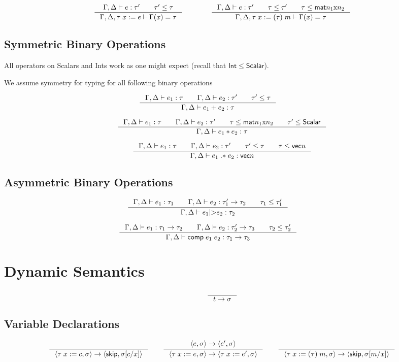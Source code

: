 \documentclass{article}
\begin{document}
\[  %
\inference[]{\Gamma,\Delta|-e:\tau'\qquad\tau'\leq\tau}{\Gamma,\Delta,\tau\;x:=e|-\Gamma(x)=\tau}
\qquad\qquad
\inference[]{\Gamma,\Delta|-e:\tau'\qquad\tau\leq\tau'\qquad\tau\leq\mat}
{\Gamma,\Delta,\tau\;x:=(\tau)\;m|-\Gamma(x)=\tau}
\]

\subsection{Symmetric Binary Operations}

All operators on Scalars and Ints work as one might expect (recall that $\mathsf{Int}\leq\mathsf{Scalar}$).

We assume symmetry for typing for all following binary operations

\[  %
\inference[]{\Gamma,\Delta|-e_1:\tau\qquad\Gamma,\Delta|-e_2:\tau'\qquad\tau'\leq\tau}
{\Gamma,\Delta|-e_1+e_2:\tau}
\qquad\qquad
\]

\[
\inference[]{\Gamma,\Delta|-e_1:\tau\qquad\Gamma,\Delta|-e_2:\tau'\qquad\tau\leq\mat\qquad\tau'\leq\mathsf{Scalar}}
{\Gamma,\Delta|-e_1*e_2:\tau}
\]

\[ %
\inference[]{\Gamma,\Delta|-e_1:\tau\qquad\Gamma,\Delta|-e_2:\tau'\qquad\tau'\leq\tau\qquad\tau\leq\mathsf{vec}n}
{\Gamma,\Delta|-e_1\;\mathsf{.*}\;e_2:\mathsf{vec}n}
\]

\subsection{Asymmetric Binary Operations}

\[  %
\inference[]{\Gamma,\Delta|-e_1:\tau_1\qquad\Gamma,\Delta|-e_2:\tau_1'->\tau_2\qquad\tau_1\leq\tau_1'}
{\Gamma,\Delta|-e_1\textnormal{|>}e_2:\tau_2}
\qquad\qquad
\]

\[  %
\inference[]{\Gamma,\Delta|-e_1:\tau_1->\tau_2\qquad\Gamma,\Delta|-e_2:\tau_2'->\tau_3\qquad\tau_2\leq\tau_2'}
{\Gamma,\Delta|-\mathsf{comp}\;e_1\;e_2:\tau_1->\tau_3}
\qquad\qquad
\]

\section{Dynamic Semantics}

\[
\inference[]{}{t->\sigma}
\]

\subsection{Variable Declarations}
\[
\inference[]{}{\env{\tau\;x:=c}->\langle\mathsf{skip},\sigma[c/x]\rangle}
\qquad
\inference[]{\env{e}->\env{e'}}{\env{\tau\;x:=e}->\env{\tau\;x:=e'}}
\qquad
\inference[]{}{\env{\tau\;x:=(\tau)\;m}->\langle\mathsf{skip},\sigma[m/x]\rangle}
\]
\end{document}

